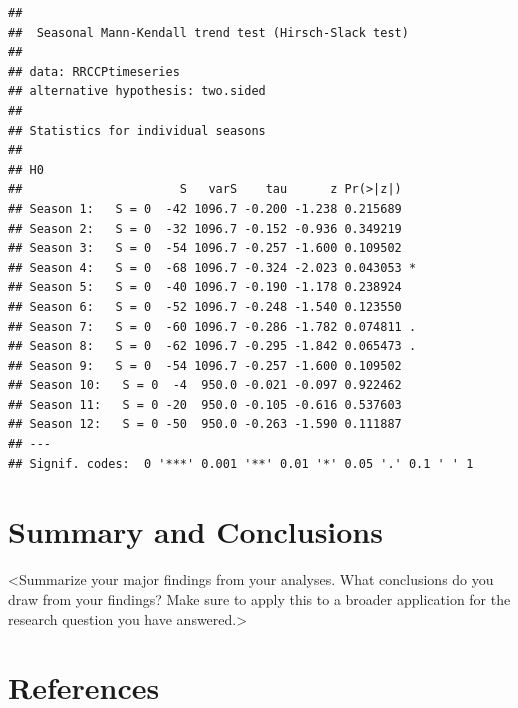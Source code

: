 \documentclass[12pt,]{article}
\begin{document}
\begin{verbatim}
## 
##  Seasonal Mann-Kendall trend test (Hirsch-Slack test)
## 
## data: RRCCPtimeseries
## alternative hypothesis: two.sided
## 
## Statistics for individual seasons
## 
## H0
##                      S   varS    tau      z Pr(>|z|)  
## Season 1:   S = 0  -42 1096.7 -0.200 -1.238 0.215689  
## Season 2:   S = 0  -32 1096.7 -0.152 -0.936 0.349219  
## Season 3:   S = 0  -54 1096.7 -0.257 -1.600 0.109502  
## Season 4:   S = 0  -68 1096.7 -0.324 -2.023 0.043053 *
## Season 5:   S = 0  -40 1096.7 -0.190 -1.178 0.238924  
## Season 6:   S = 0  -52 1096.7 -0.248 -1.540 0.123550  
## Season 7:   S = 0  -60 1096.7 -0.286 -1.782 0.074811 .
## Season 8:   S = 0  -62 1096.7 -0.295 -1.842 0.065473 .
## Season 9:   S = 0  -54 1096.7 -0.257 -1.600 0.109502  
## Season 10:   S = 0  -4  950.0 -0.021 -0.097 0.922462  
## Season 11:   S = 0 -20  950.0 -0.105 -0.616 0.537603  
## Season 12:   S = 0 -50  950.0 -0.263 -1.590 0.111887  
## ---
## Signif. codes:  0 '***' 0.001 '**' 0.01 '*' 0.05 '.' 0.1 ' ' 1
\end{verbatim}

\newpage

\hypertarget{summary-and-conclusions}{%
\section{Summary and Conclusions}\label{summary-and-conclusions}}

\textless{}Summarize your major findings from your analyses. What
conclusions do you draw from your findings? Make sure to apply this to a
broader application for the research question you have
answered.\textgreater{}

\hypertarget{references}{%
\section{References}\label{references}}
\end{document}
